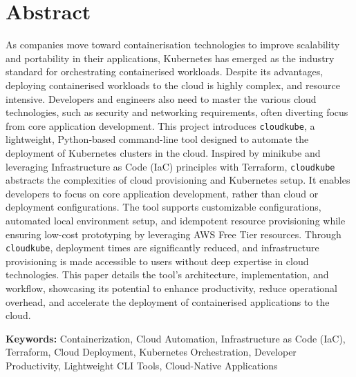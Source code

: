 
\chapter*{Abstract}
As companies move toward containerisation technologies to improve scalability and portability in their applications, Kubernetes has emerged as the industry standard for orchestrating containerised workloads. Despite its advantages, deploying containerised workloads to the cloud is highly complex, and resource intensive. Developers and engineers also need to master the various cloud technologies, such as security and networking requirements, often diverting focus from core application development. 
This project introduces \texttt{cloudkube}, a lightweight, Python-based command-line tool designed to automate the deployment of Kubernetes clusters in the cloud. Inspired by minikube and leveraging Infrastructure as Code (IaC) principles with Terraform, \texttt{cloudkube} abstracts the complexities of cloud provisioning and Kubernetes setup. It enables developers to focus on core application development, rather than cloud or deployment configurations. The tool supports customizable configurations, automated local environment setup, and idempotent resource provisioning while ensuring low-cost prototyping by leveraging AWS Free Tier resources.
Through \texttt{cloudkube}, deployment times are significantly reduced, and infrastructure provisioning is made accessible to users without deep expertise in cloud technologies. This paper details the tool’s architecture, implementation, and workflow, showcasing its potential to enhance productivity, reduce operational overhead, and accelerate the deployment of containerised applications to the cloud. 
\\
\par
\textbf{Keywords:} Containerization, Cloud Automation, Infrastructure as Code (IaC), Terraform, Cloud Deployment, Kubernetes Orchestration, Developer Productivity, Lightweight CLI Tools, Cloud-Native Applications

